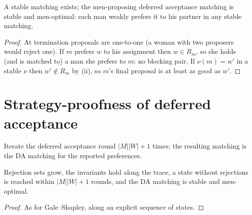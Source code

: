 \begin{theorem}
\label{thm:gale-shapley}
\leanok
{}
A stable matching exists; the men-proposing deferred acceptance matching is stable and men-optimal: each
man weakly prefers it to his partner in any stable matching.
\end{theorem}
\begin{proof}
\leanok
At termination proposals are one-to-one (a woman with two proposers would reject one). If $m$ prefers $w$ to his
assignment then $w \in R_m$, so she holds (and is matched to) a man she prefers to $m$: no blocking pair. If
$\nu(m) = w'$ in a stable $\nu$ then $w' \notin R_m$ by (ii), so $m$'s final proposal is at least as good as $w'$.
\end{proof}

\section{Strategy-proofness of deferred acceptance}

\begin{definition}
\label{def:da-mech}
\leanok
{}
Iterate the deferred acceptance round $|M||W| + 1$ times; the resulting matching is the DA matching for the
reported preferences.
\end{definition}

\begin{lemma}[DA trace]
\label{lem:da-trace}
\leanok
{}
Rejection sets grow, the invariants hold along the trace, a state without rejections is reached within
$|M||W| + 1$ rounds, and the DA matching is stable and men-optimal.
\end{lemma}
\begin{proof}
\leanok
As for Gale--Shapley, along an explicit sequence of states.
\end{proof}


